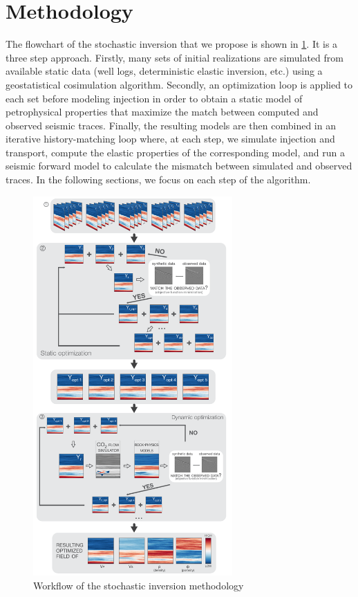 \section{Methodology}
\label{sc:metho_art2}
The flowchart of the stochastic inversion that we propose is shown in
\cref{fig:workflow}.  It is a three step approach. Firstly, many sets of initial
realizations are simulated from available static data (well logs, deterministic
elastic inversion, etc.) using a geostatistical cosimulation algorithm.
Secondly, an optimization loop is applied to each set before modeling 
injection in order to obtain a static model of petrophysical properties that
maximize the match between computed and observed seismic traces. Finally, the
resulting models are then combined in an iterative history-matching loop where,
at each step, we simulate  injection and transport, compute the elastic
properties of the corresponding model, and run a seismic forward model to
calculate the mismatch between simulated and observed traces. In the following
sections, we focus on each step of the algorithm.
\begin{figure}[!ht]
\centering
\includegraphics[width=0.68\textwidth]{fig/workflow_authorea.pdf}
\caption{Workflow of the stochastic inversion methodology}
\label{fig:workflow}
\end{figure}
